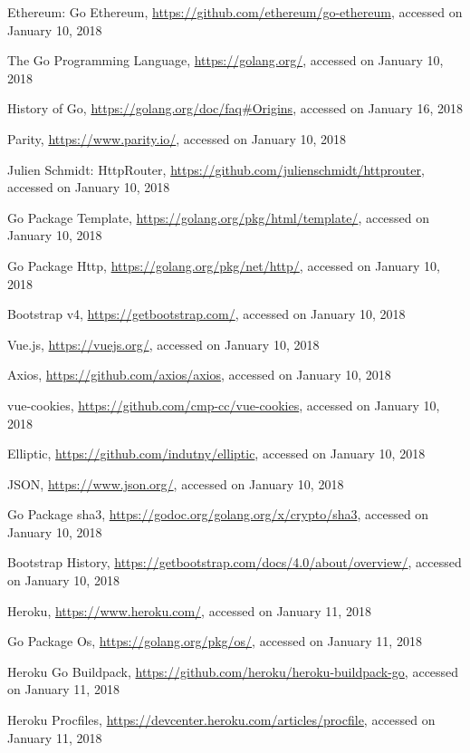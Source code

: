 \begin{thebibliography}{99}
 Ethereum: Go Ethereum, \url{https://github.com/ethereum/go-ethereum}, accessed on January 10, 2018

 The Go Programming Language, \url{https://golang.org/}, accessed on January 10, 2018

 History of Go, \url{https://golang.org/doc/faq#Origins}, accessed on January 16, 2018

 Parity, \url{https://www.parity.io/}, accessed on January 10, 2018

 Julien Schmidt: HttpRouter, \url{https://github.com/julienschmidt/httprouter}, accessed on January 10, 2018

 Go Package Template, \url{https://golang.org/pkg/html/template/}, accessed on January 10, 2018

 Go Package Http, \url{https://golang.org/pkg/net/http/}, accessed on January 10, 2018

 Bootstrap v4, \url{https://getbootstrap.com/}, accessed on January 10, 2018

 Vue.js, \url{https://vuejs.org/}, accessed on January 10, 2018

 Axios, \url{https://github.com/axios/axios}, accessed on January 10, 2018

 vue-cookies, \url{https://github.com/cmp-cc/vue-cookies}, accessed on January 10, 2018

 Elliptic, \url{https://github.com/indutny/elliptic}, accessed on January 10, 2018

 JSON, \url{https://www.json.org/}, accessed on January 10, 2018

 Go Package sha3, \url{https://godoc.org/golang.org/x/crypto/sha3}, accessed on January 10, 2018

 Bootstrap History, \url{https://getbootstrap.com/docs/4.0/about/overview/}, accessed on January 10, 2018

 Heroku, \url{https://www.heroku.com/}, accessed on January 11, 2018

 Go Package Os, \url{https://golang.org/pkg/os/}, accessed on January 11, 2018

 Heroku Go Buildpack, \url{https://github.com/heroku/heroku-buildpack-go}, accessed on January 11, 2018

 Heroku Procfiles, \url{https://devcenter.heroku.com/articles/procfile}, accessed on January 11, 2018


\end{thebibliography}
